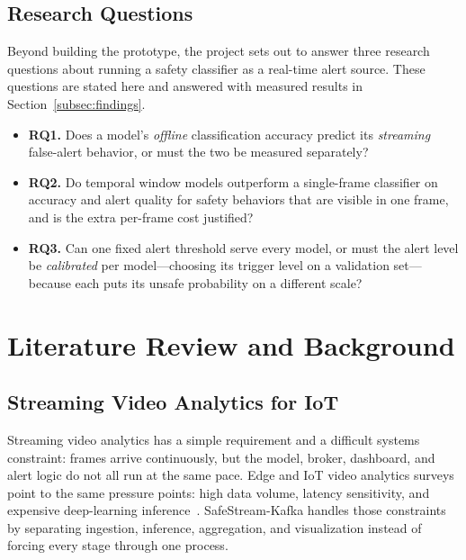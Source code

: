 \documentclass[conference]{IEEEtran}
\begin{document}
\subsection{Research Questions}
\label{subsec:research-questions}

Beyond building the prototype, the project sets out to answer three
research questions about running a safety classifier as a real-time alert
source. These questions are stated here and answered with measured results
in Section~\ref{subsec:findings}.

\begin{itemize}
\item \textbf{RQ1.} Does a model's \emph{offline} classification accuracy
predict its \emph{streaming} false-alert behavior, or must the two be
measured separately?

\item \textbf{RQ2.} Do temporal window models outperform a single-frame
classifier on accuracy and alert quality for safety behaviors that are
visible in one frame, and is the extra per-frame cost justified?

\item \textbf{RQ3.} Can one fixed alert threshold serve every model, or
must the alert level be \emph{calibrated} per model---choosing its trigger
level on a validation set---because each puts its unsafe probability on a
different scale?
\end{itemize}

\section{Literature Review and Background}

\subsection{Streaming Video Analytics for IoT}

Streaming video analytics has a simple requirement and a difficult systems constraint: frames arrive continuously, but the model, broker, dashboard, and alert logic do not all run at the same pace. Edge and IoT video analytics surveys point to the same pressure points: high data volume, latency sensitivity, and expensive deep-learning inference~\cite{b1,b2}. SafeStream-Kafka handles those constraints by separating ingestion, inference, aggregation, and visualization instead of forcing every stage through one process.
\end{document}
